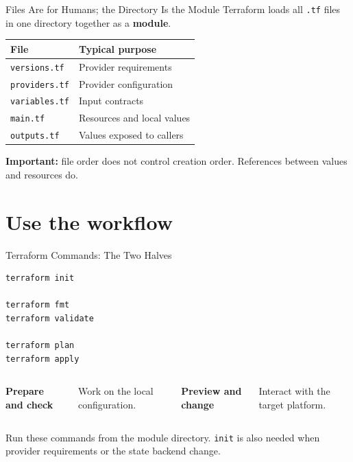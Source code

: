 \documentclass[aspectratio=169, xcolor=table]{beamer}
\begin{document}
\begin{frame}{Files Are for Humans; the Directory Is the Module}
  Terraform loads all \texttt{.tf} files in one directory together as a \textbf{module}.

  \vspace{0.6em}
  \begin{center}
    \small
    \renewcommand{\arraystretch}{1.3}
    \begin{tabular}{|p{}|p{}|}
      \hline
      \rowcolor{PrimaryAccent}
      \textbf{File} & \textbf{Typical purpose} \\
      \hline
      \texttt{versions.tf} & Provider requirements \\
      \hline
      \texttt{providers.tf} & Provider configuration \\
      \hline
      \texttt{variables.tf} & Input contracts \\
      \hline
      \texttt{main.tf} & Resources and local values \\
      \hline
      \texttt{outputs.tf} & Values exposed to callers \\
      \hline
    \end{tabular}
  \end{center}

  \vspace{0.5em}
  \textcolor{SecondaryAccent}{\textbf{Important:}} file order does not control creation
  order. References between values and resources do.
\end{frame}

\section{Use the workflow}

\begin{frame}[fragile]{Terraform Commands: The Two Halves}
  \begin{lstlisting}[basicstyle=\ttfamily\scriptsize\color{CodeText}]
terraform init

terraform fmt
terraform validate

terraform plan
terraform apply
  \end{lstlisting}

  \begin{columns}[T]
    \textbf{Prepare and check}

    Work on the local configuration.

    \textbf{Preview and change}

    Interact with the target platform.
  \end{columns}

  \vspace{2em}
  Run these commands from the module directory. \texttt{init} is also needed when provider
  requirements or the state backend change.
\end{frame}
\end{document}

